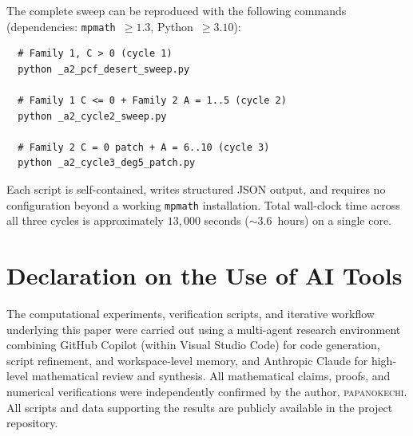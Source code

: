 \documentclass[11pt]{amsart}
\theoremstyle{plain}
\theoremstyle{remark}
\begin{document}
The complete sweep can be reproduced with the following commands
(dependencies: \texttt{mpmath}~$\geq 1.3$, Python~$\geq 3.10$):
\begin{verbatim}
  # Family 1, C > 0 (cycle 1)
  python _a2_pcf_desert_sweep.py

  # Family 1 C <= 0 + Family 2 A = 1..5 (cycle 2)
  python _a2_cycle2_sweep.py

  # Family 2 C = 0 patch + A = 6..10 (cycle 3)
  python _a2_cycle3_deg5_patch.py
\end{verbatim}
Each script is self-contained, writes structured JSON output, and
requires no configuration beyond a working \texttt{mpmath}
installation.
Total wall-clock time across all three cycles is approximately
$13{,}000$ seconds (${\sim}3.6$~hours) on a single core.

\section*{Declaration on the Use of AI Tools}

The computational experiments, verification scripts, and iterative
workflow underlying this paper were carried out using a multi-agent
research environment combining GitHub Copilot (within Visual Studio
Code) for code generation, script refinement, and workspace-level
memory, and Anthropic Claude for high-level mathematical review and
synthesis.  All mathematical claims, proofs, and numerical
verifications were independently confirmed by the author,
\textsc{papanokechi}.  All scripts and data supporting the results
are publicly available in the project repository.
\end{document}
